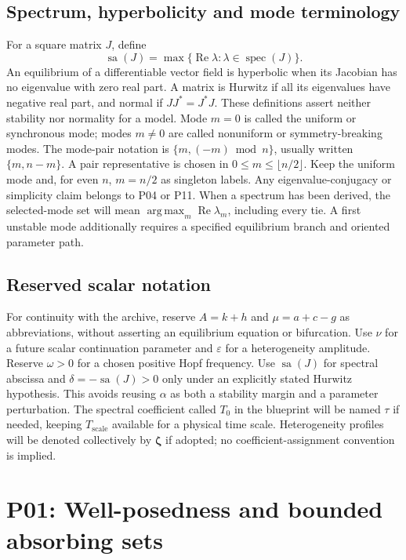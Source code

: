 \documentclass[11pt]{article}
\newcommand{\eps}{\varepsilon}
\DeclareMathOperator{\spec}{spec}
\DeclareMathOperator{\sa}{sa}
\DeclareMathOperator{\Ree}{Re}
\DeclareMathOperator*{\argmax}{arg\,max}
\theoremstyle{definition}
\theoremstyle{remark}
\begin{document}
\subsection{Spectrum, hyperbolicity and mode terminology}
For a square matrix $J$, define
\[
\sa(J)=\max\{\Ree\lambda:\lambda\in\spec(J)\}.
\]
An equilibrium of a differentiable vector field is hyperbolic when its
Jacobian has no eigenvalue with zero real part. A matrix is Hurwitz if all
its eigenvalues have negative real part, and normal if $JJ^*=J^*J$.
These definitions assert neither stability nor normality for a model.
Mode $m=0$ is called the uniform or synchronous mode; modes $m\neq0$ are
called nonuniform or symmetry-breaking modes. The mode-pair notation is
$\{m,(-m)\bmod n\}$, usually written $\{m,n-m\}$. A pair representative is
chosen in $0\leq m\leq\lfloor n/2\rfloor$. Keep the uniform mode and, for
even $n$, $m=n/2$ as singleton labels. Any eigenvalue-conjugacy or simplicity
claim belongs to P04 or P11.
When a spectrum has been derived, the selected-mode set will mean
$\argmax_m\Ree\lambda_m$, including every tie. A first unstable mode additionally
requires a specified equilibrium branch and oriented parameter path.

\subsection{Reserved scalar notation}
For continuity with the archive, reserve $A=k+h$ and $\mu=a+c-g$ as
abbreviations, without asserting an equilibrium equation or bifurcation.
Use $\nu$ for a future scalar continuation parameter and $\eps$ for a
heterogeneity amplitude. Reserve $\omega>0$ for a chosen positive Hopf
frequency. Use $\sa(J)$ for spectral abscissa and $\delta=-\sa(J)>0$ only
under an explicitly stated Hurwitz hypothesis. This avoids reusing
$\alpha$ as both a stability margin and a parameter perturbation.
The spectral coefficient called $T_0$ in the blueprint will be named
$\tau$ if needed, keeping $T_{\mathrm{scale}}$ available for a physical
time scale. Heterogeneity profiles will be denoted collectively by
$\boldsymbol\zeta$ if adopted; no coefficient-assignment convention is implied.


\section{P01: Well-posedness and bounded absorbing sets}
\label{sec:P01}
\end{document}
